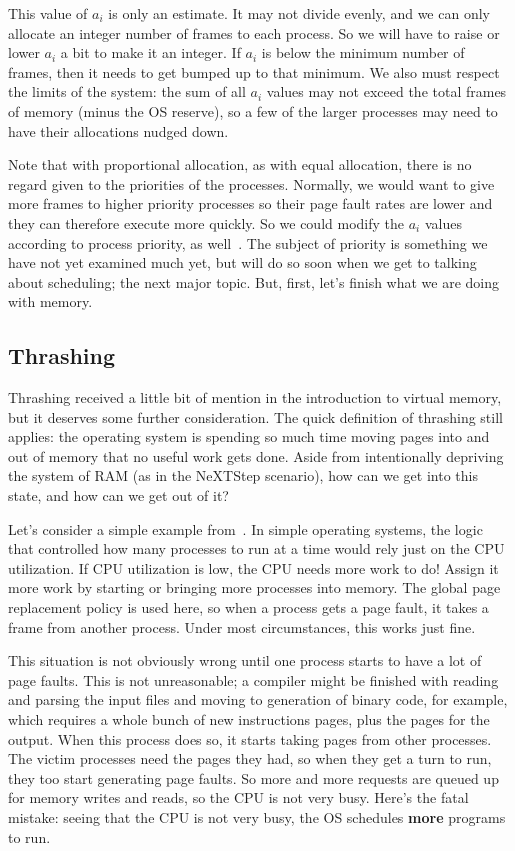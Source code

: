This value of $a_{i}$ is only an estimate. It may not divide evenly, and we can only allocate an integer number of frames to each process.  So we will have to raise or lower $a_{i}$ a bit to make it an integer. If $a_{i}$ is below the minimum number of frames, then it needs to get bumped up to that minimum. We also must respect the limits of the system: the sum of all $a_{i}$ values may not exceed the total frames of memory (minus the OS reserve), so a few of the larger processes may need to have their allocations nudged down.

Note that with proportional allocation, as with equal allocation, there is no regard given to the priorities of the processes. Normally, we would want to give more frames to higher priority processes so their page fault rates are lower and they can therefore execute more quickly. So we could modify the $a_{i}$ values according to process priority, as well~\cite{osc}. The subject of priority is something we have not yet examined much yet, but will do so soon when we get to talking about scheduling; the next major topic. But, first, let's finish what we are doing with memory.


\subsection*{Thrashing}
Thrashing received a little bit of mention in the introduction to virtual memory, but it deserves some further consideration. The quick definition of thrashing still applies: the operating system is spending so much time moving pages into and out of memory that no useful work gets done. Aside from intentionally depriving the system of RAM (as in the NeXTStep scenario), how can we get into this state, and how can we get out of it?

Let's consider a simple example from~\cite{osc}. In simple operating systems, the logic that controlled how many processes to run at a time would rely just on the CPU utilization. If CPU utilization is low, the CPU needs more work to do! Assign it more work by starting or bringing more processes into memory. The global page replacement policy is used here, so when a process gets a page fault, it takes a frame from another process. Under most circumstances, this works just fine.

This situation is not obviously wrong until one process starts to have a lot of page faults. This is not unreasonable; a compiler might be finished with reading and parsing the input files and moving to generation of binary code, for example, which requires a whole bunch of new instructions pages, plus the pages for the output. When this process does so, it starts taking pages from other processes. The victim processes need the pages they had, so when they get a turn to run, they too start generating page faults. So more and more requests are queued up for memory writes and reads, so the CPU is not very busy. Here's the fatal mistake: seeing that the CPU is not very busy, the OS schedules \textbf{more} programs to run.  

